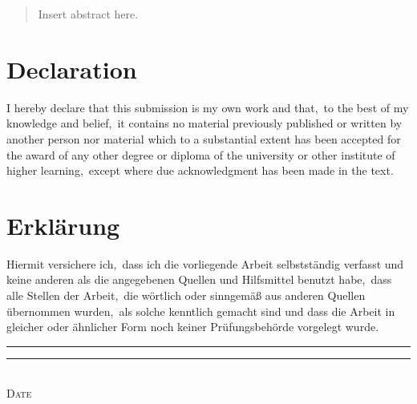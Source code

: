\begin{abstract}

Insert abstract here.
\end{abstract}

\pagestyle{scrplain} %
\section*{Declaration}
I hereby declare that this submission is my own work and that,\ to the best of my
knowledge and belief,\ it contains no material previously published or written by another
person nor material which to a substantial extent has been accepted for the award of any
other degree or diploma of the university or other institute of higher learning,\ except
where due acknowledgment has been made in the text\@.

\section*{Erkl\"{a}rung}
{
Hiermit versichere ich,\ dass ich die vorliegende Arbeit selbstst\"{a}ndig verfasst und keine
anderen als die angegebenen Quellen und Hilfsmittel benutzt habe,\ dass alle Stellen
der Arbeit,\ die w\"{o}rtlich oder sinngem\"{a}\ss{} aus anderen Quellen \"{u}bernommen wurden,\ als
solche kenntlich gemacht sind und dass die Arbeit in gleicher oder \"{a}hnlicher Form noch
keiner Pr\"{u}fungsbeh\"{o}rde vorgelegt wurde\@.}

\vspace{2cm}
\rule{4cm}{0.1pt} \hfill \rule{7cm}{0.1pt} \\
\hspace*{1.75cm} \textsc{Date} \hspace*{6.8cm} \textsc{\@author}

\cleardoublepage
\pagestyle{scrheadings} %

\tableofcontents

\cleardoublepage